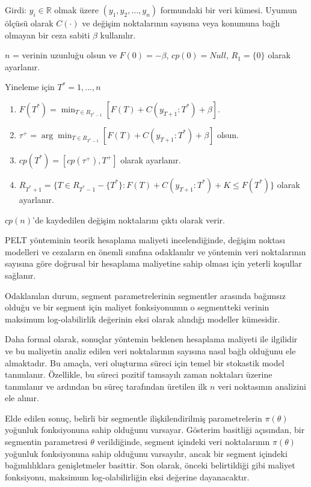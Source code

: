 \documentclass[12pt,twoside]{deuthesis}
\begin{document}
Girdi: \(y_i \in \mathbb{R}\) olmak üzere \((y_1, y_2, \ldots, y_n)\) formundaki bir veri kümesi. Uyumun ölçüsü olarak \(C(\cdot)\) ve değişim noktalarının sayısına veya konumuna bağlı olmayan bir ceza sabiti \(\beta\) kullanılır.

\(n\) = verinin uzunluğu olsun ve \(F(0) = -\beta\), \(cp(0) = Null\), \(R_1 = \{0\}\) olarak ayarlanır.

Yineleme için \(T^* = 1, \ldots, n\)

\begin{enumerate}
\def\labelenumi{\arabic{enumi}.}
\item
  \(F(T^*) = \min_{T \in R_{T^*-1}} [F(T) + C(y_{T+1}:T^*) + \beta]\).
\item
  \(\tau^+ = \arg \min_{T \in R_{T^*-1}} [F(T) + C(y_{T+1}:T^*) + \beta]\) olsun.
\item
  \(cp(T^*) = [cp(\tau^+), T^+]\) olarak ayarlanır.
\item
  \(R_{T^*+1} = \{T \in R_{T^*-1} - \{T^*\} : F(T) + C(y_{T+1}:T^*) + K \leq F(T^*)\}\) olarak ayarlanır.
\end{enumerate}

\(cp(n)\)'de kaydedilen değişim noktalarını çıktı olarak verir.

PELT yönteminin teorik hesaplama maliyeti incelendiğinde, değişim noktası modelleri ve cezaların en önemli sınıfına odaklanılır ve yöntemin veri noktalarının sayısına göre doğrusal bir hesaplama maliyetine sahip olması için yeterli koşullar sağlanır.

Odaklanılan durum, segment parametrelerinin segmentler arasında bağımsız olduğu ve bir segment için maliyet fonksiyonunun o segmentteki verinin maksimum log-olabilirlik değerinin eksi olarak alındığı modeller kümesidir.

Daha formal olarak, sonuçlar yöntemin beklenen hesaplama maliyeti ile ilgilidir ve bu maliyetin analiz edilen veri noktalarının sayısına nasıl bağlı olduğunu ele almaktadır. Bu amaçla, veri oluşturma süreci için temel bir stokastik model tanımlanır. Özellikle, bu süreci pozitif tamsayılı zaman noktaları üzerine tanımlanır ve ardından bu süreç tarafından üretilen ilk \(n\) veri noktasının analizini ele alınır.

Elde edilen sonuç, belirli bir segmentle ilişkilendirilmiş parametrelerin \(\pi(\theta)\) yoğunluk fonksiyonuna sahip olduğunu varsayar. Gösterim basitliği açısından, bir segmentin parametresi \(\theta\) verildiğinde, segment içindeki veri noktalarının \(\pi(\theta)\) yoğunluk fonksiyonuna sahip olduğunu varsayılır, ancak bir segment içindeki bağımlılıklara genişletmeler basittir. Son olarak, önceki belirtildiği gibi maliyet fonksiyonu, maksimum log-olabilirliğin eksi değerine dayanacaktır.
\end{document}
